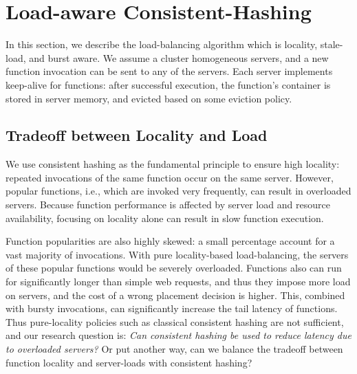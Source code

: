 \section{Load-aware Consistent-Hashing} %
\label{sec:chrlu}

In this section, we describe the load-balancing algorithm which is locality, stale-load, and burst aware.
We assume a cluster  homogeneous servers, and 
a new function invocation can be sent to any of the servers.
Each server implements keep-alive for functions: after successful execution, the function's container is stored in server memory, and evicted based on some eviction policy. %


\subsection{Tradeoff between Locality and Load}

We use consistent hashing as the fundamental principle to ensure high locality: repeated invocations of the same function occur on the same server. 
However, popular functions, i.e., which are invoked very frequently, can result in overloaded servers.
Because function performance is affected by server load and resource availability, focusing on locality alone can result in slow function execution.

Function popularities are also highly skewed: a small percentage account for a vast majority of invocations.
With pure locality-based load-balancing, the servers of these popular functions would be severely overloaded.
Functions also can run for significantly longer than simple web requests, and thus they impose more load on servers, and the cost of a wrong placement decision is higher. 
This, combined with bursty invocations, can significantly increase the tail latency of functions. 
Thus pure-locality policies such as classical consistent hashing are not sufficient, and 
our research question is: \emph{Can consistent hashing be used to reduce latency due to overloaded servers?} 
Or put another way, can we balance the tradeoff between function locality and server-loads with consistent hashing? 


